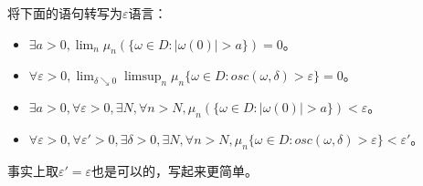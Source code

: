 \documentclass{ctexart}
\newif\ifpreface
\begin{document}
\large
\setlength{\baselineskip}{1.2em}
\ifpreface

\newgeometry{left=2cm,right=2cm,top=2cm,bottom=2cm}
\else
{}
\maketitle
\fi
\begin{problem}\label{pro:0}
  将下面的语句转写为\(\varepsilon \)语言：
  \begin{itemize}
    \item \(\exists a > 0, \lim_{n} \mu_n(\{\omega \in D:|\omega(0)|>a\}) = 0 \)。
    \item \(\forall \varepsilon > 0, \lim_{\delta \searrow 0} \limsup_{n} \mu_n\{\omega \in D:osc(\omega,\delta)>\varepsilon\} = 0\)。
  \end{itemize}
\end{problem}
\begin{solution}
  \begin{itemize}
    \item \(\exists a >0,\forall \varepsilon > 0,\exists N, \forall n > N, \mu_n(\{\omega \in D: |\omega(0)|>a\}) < \varepsilon \)。
    \item \(\forall \varepsilon > 0, \forall \varepsilon'> 0, \exists \delta > 0, \exists N, \forall n>N, \mu_n\{\omega \in D:osc(\omega,\delta)>\varepsilon\} < \varepsilon'  \)。
  \end{itemize}
  事实上取\(\varepsilon' = \varepsilon \)也是可以的，写起来更简单。
\end{solution}
\end{document}
